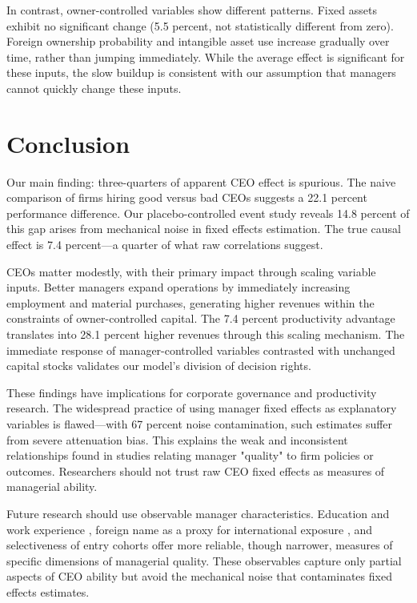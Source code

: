 \documentclass[11pt,a4paper]{article}
\begin{document}
In contrast, owner-controlled variables show different patterns. Fixed assets exhibit no significant change (5.5 percent, not statistically different from zero). Foreign ownership probability and intangible asset use increase gradually over time, rather than jumping immediately. While the average effect is significant for these inputs, the slow buildup is consistent with our assumption that managers cannot quickly change these inputs.


\section{Conclusion}

Our main finding: three-quarters of apparent CEO effect is spurious. The naive comparison of firms hiring good versus bad CEOs suggests a 22.1 percent performance difference. Our placebo-controlled event study reveals 14.8 percent of this gap arises from mechanical noise in fixed effects estimation. The true causal effect is 7.4 percent—a quarter of what raw correlations suggest.

CEOs matter modestly, with their primary impact through scaling variable inputs. Better managers expand operations by immediately increasing employment and material purchases, generating higher revenues within the constraints of owner-controlled capital. The 7.4 percent productivity advantage translates into 28.1 percent higher revenues through this scaling mechanism. The immediate response of manager-controlled variables contrasted with unchanged capital stocks validates our model's division of decision rights.

These findings have implications for corporate governance and productivity research. The widespread practice of using manager fixed effects as explanatory variables is flawed—with 67 percent noise contamination, such estimates suffer from severe attenuation bias. This explains the weak and inconsistent relationships found in studies relating manager "quality" to firm policies or outcomes. Researchers should not trust raw CEO fixed effects as measures of managerial ability.

Future research should use observable manager characteristics. Education and work experience \citep{DePirro2025}, foreign name as a proxy for international exposure \citep{Koren2023expat}, and selectiveness of entry cohorts \citep{koren2024managers} offer more reliable, though narrower, measures of specific dimensions of managerial quality. These observables capture only partial aspects of CEO ability but avoid the mechanical noise that contaminates fixed effects estimates.
\end{document}

